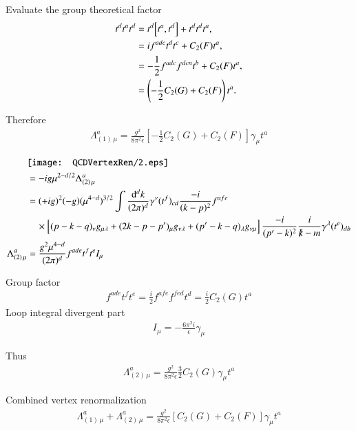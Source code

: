 Evaluate the group theoretical factor
\begin{align*}
   t^d t^a t^d &= t^d \comm{t^a}{t^d} + t^d t^d t^a, \\
               &= if^{adc} t^d t^c + C_2 (F) t^a, \\
               &= -\frac{1}{2} f^{adc} f^{dcn}t^b + C_2(F)t^a, \\
               &= \left(-\frac{1}{2} C_2(G) + C_2(F) \right)t^a.
\end{align*}

Therefore
\begin{align}
   \Lambda_{(1)\,\mu}^a = \frac{g^2}{8 \pi^2 \epsilon} \left[ - \frac{1}{2} C_2 (G) + C_2 (F) \right] \gamma_\mu t^a
\end{align}

\begin{align*}
   &\texttt{[image: QCDVertexRen/2.eps]} \\
   &= -ig \mu^{2-d/2} \Lambda_{(2)\,\mu}^a \\
   &= (+ig)^2 (-g) (\mu^{4-d})^{3/2} \int \frac{\dd[d]{k}}{(2\pi)^d} \gamma^\nu (t^f)_{cd} \frac{-i}{(k-p)^2} f^{afe}  \\
   &\quad \times \left[ (p-k-q)_\nu g_{\mu\lambda} + (2k - p - p')_\mu g_{\nu\lambda} + (p' - k - q)_\lambda g_{\nu\mu} \right]\frac{-i}{(p' - k)^2} \frac{i}{\slashed{k}-m} \gamma^\lambda (t^e)_{db}\\
   \Lambda_{(2)\, \mu}^a &= \frac{g^2 \mu^{4-d}}{(2\pi)^d} f^{ade} t^f t^e I_\mu
\end{align*}

Group factor
\begin{align*}
   f^{ade} t^f t^e = \frac{i}{2} f^{afe}f^{fed}t^d = \frac{i}{2} C_2(G) t^a 
\end{align*}
Loop integral divergent part
\begin{align*}
   I_\mu = - \frac{6 \pi^2 i }{\epsilon} \gamma_\mu
\end{align*}

Thus
\begin{align}
   \Lambda_{(2)\,\mu}^a = \frac{g^2}{8 \pi^2 \epsilon} \frac{3}{2} C_2 (G) \gamma_\mu t^a
\end{align}

Combined vertex renormalization
\begin{align}
   \Lambda_{(1)\,\mu}^a + \Lambda_{(2)\,\mu}^a = \frac{g^2}{8\pi^2 \epsilon} \left[ C_2 (G) + C_2 (F) \right]\gamma_\mu t^a
\end{align}


